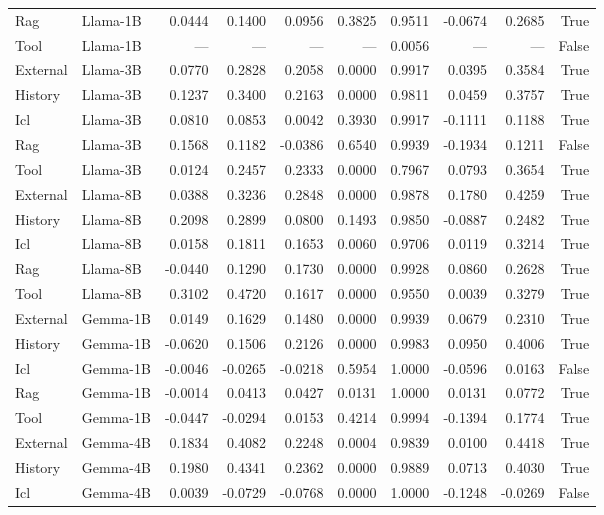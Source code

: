 \begin{tabular}{llrrrrrrrr}
Rag & Llama-1B & 0.0444 & 0.1400 & 0.0956 & 0.3825 & 0.9511 & -0.0674 & 0.2685 & True \\
Tool & Llama-1B & --- & --- & --- & --- & 0.0056 & --- & --- & False \\
External & Llama-3B & 0.0770 & 0.2828 & 0.2058 & 0.0000 & 0.9917 & 0.0395 & 0.3584 & True \\
History & Llama-3B & 0.1237 & 0.3400 & 0.2163 & 0.0000 & 0.9811 & 0.0459 & 0.3757 & True \\
Icl & Llama-3B & 0.0810 & 0.0853 & 0.0042 & 0.3930 & 0.9917 & -0.1111 & 0.1188 & True \\
Rag & Llama-3B & 0.1568 & 0.1182 & -0.0386 & 0.6540 & 0.9939 & -0.1934 & 0.1211 & False \\
Tool & Llama-3B & 0.0124 & 0.2457 & 0.2333 & 0.0000 & 0.7967 & 0.0793 & 0.3654 & True \\
External & Llama-8B & 0.0388 & 0.3236 & 0.2848 & 0.0000 & 0.9878 & 0.1780 & 0.4259 & True \\
History & Llama-8B & 0.2098 & 0.2899 & 0.0800 & 0.1493 & 0.9850 & -0.0887 & 0.2482 & True \\
Icl & Llama-8B & 0.0158 & 0.1811 & 0.1653 & 0.0060 & 0.9706 & 0.0119 & 0.3214 & True \\
Rag & Llama-8B & -0.0440 & 0.1290 & 0.1730 & 0.0000 & 0.9928 & 0.0860 & 0.2628 & True \\
Tool & Llama-8B & 0.3102 & 0.4720 & 0.1617 & 0.0000 & 0.9550 & 0.0039 & 0.3279 & True \\
External & Gemma-1B & 0.0149 & 0.1629 & 0.1480 & 0.0000 & 0.9939 & 0.0679 & 0.2310 & True \\
History & Gemma-1B & -0.0620 & 0.1506 & 0.2126 & 0.0000 & 0.9983 & 0.0950 & 0.4006 & True \\
Icl & Gemma-1B & -0.0046 & -0.0265 & -0.0218 & 0.5954 & 1.0000 & -0.0596 & 0.0163 & False \\
Rag & Gemma-1B & -0.0014 & 0.0413 & 0.0427 & 0.0131 & 1.0000 & 0.0131 & 0.0772 & True \\
Tool & Gemma-1B & -0.0447 & -0.0294 & 0.0153 & 0.4214 & 0.9994 & -0.1394 & 0.1774 & True \\
External & Gemma-4B & 0.1834 & 0.4082 & 0.2248 & 0.0004 & 0.9839 & 0.0100 & 0.4418 & True \\
History & Gemma-4B & 0.1980 & 0.4341 & 0.2362 & 0.0000 & 0.9889 & 0.0713 & 0.4030 & True \\
Icl & Gemma-4B & 0.0039 & -0.0729 & -0.0768 & 0.0000 & 1.0000 & -0.1248 & -0.0269 & False \\

\end{tabular}
